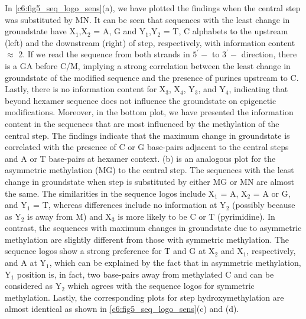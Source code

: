 In \cref{c6:fig5_seq_logo_sens}(a), we have plotted the findings when the central \cpg step was substituted by MN. 
It can be seen that sequences with the least change in groundstate have X$_1$,X$_2$ = A, G and Y$_1$,Y$_2$ = T, C alphabets to the upstream (left) and the downstream (right) of \cpg step, respectively, with information content $\approx$ 2.
If we read the sequence from both strands in $5^\prime-$ to $3^\prime-$ direction, there is a GA before C/M, implying a strong correlation between the least change in groundstate of the modified sequence and the presence of purines upstream to C.
Lastly, there is no information content for X$_3$, X$_4$, Y$_3$, and Y$_4$, indicating that beyond hexamer sequence does not influence the groundstate on epigenetic modifications.
Moreover, in the bottom plot, we have presented the information content in the sequences that are most influenced by the methylation of the central \cpg step.
The findings indicate that the maximum change in groundstate is correlated with the presence of C or G base-pairs adjacent to the central \cpg steps and A or T base-pairs at hexamer context.
(b) is an analogous plot for the asymmetric methylation (MG) to the central \cpg step. 
The sequences with the least change in groundstate when \cpg step is substituted by either MG or MN are almost the same.
The similarities in the sequence logos include X$_1$ = A, X$_2$ = A or G, and Y$_1$ = T, whereas differences include no information at Y$_2$ (possibly because as Y$_2$ is away from M) and X$_3$ is more likely to be C or T (pyrimidine). 
In contrast, the sequences with maximum changes in groundstate due to asymmetric methylation are slightly different from those with symmetric methylation.
The sequence logos show a strong preference for T and G at X$_2$ and X$_1$, respectively, and A at Y$_1$, which can be explained by the fact that in asymmetric methylation, Y$_1$ position is, in fact, two base-pairs away from methylated C and can be considered as Y$_2$ which agrees with the sequence logos for symmetric methylation.
Lastly, the corresponding plots for \cpg step hydroxymethylation are almost identical as shown in \cref{c6:fig5_seq_logo_sens}(c) and (d).


